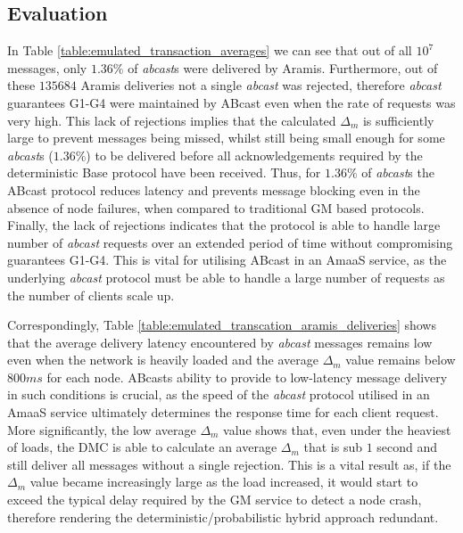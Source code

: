     \subsection{Evaluation}
    In Table \ref{table:emulated_transaction_averages} we can see that out of all $10^7$ messages, only $1.36\%$ of \emph{abcast}s were delivered by \textsf{Aramis}.  Furthermore, out of these $135684$ \textsf{Aramis} deliveries not a single \emph{abcast} was rejected, therefore \emph{abcast} guarantees G1-G4 were maintained by \textsf{ABcast} even when the rate of requests was very high.  This lack of rejections implies that the calculated $\Delta_m$ is sufficiently large to prevent messages being missed, whilst still being small enough for some \emph{abcast}s ($1.36\%$) to be delivered before all acknowledgements required by the deterministic \textsf{Base} protocol have been received.  Thus, for $1.36\%$ of \emph{abcast}s the \textsf{ABcast} protocol reduces latency and prevents message blocking even in the absence of node failures, when compared to traditional GM based protocols.  Finally, the lack of rejections indicates that the protocol is able to handle large number of \emph{abcast} requests over an extended period of time without compromising guarantees G1-G4.  This is vital for utilising \textsf{ABcast} in an \textsf{AmaaS} service, as the underlying \emph{abcast} protocol must be able to handle a large number of requests as the number of clients scale up.
       
    Correspondingly, Table \ref{table:emulated_transcation_aramis_deliveries} shows that the average delivery latency encountered by \emph{abcast} messages remains low even when the network is heavily loaded and the average $\Delta_m$ value remains below $800ms$ for each node.  \textsf{ABcast}s ability to provide to low-latency message delivery in such conditions is crucial, as the speed of the \emph{abcast} protocol utilised in an \textsf{AmaaS} service ultimately determines the response time for each client request.  More significantly, the low average $\Delta_m$ value shows that, even under the heaviest of loads, the DMC is able to calculate an average $\Delta_m$ that is sub $1$ second and still deliver all messages without a single rejection.  This is a vital result as, if the $\Delta_m$ value became increasingly large as the load increased, it would start to exceed the typical delay required by the GM service to detect a node crash, therefore rendering the deterministic/probabilistic hybrid approach redundant.  
    
